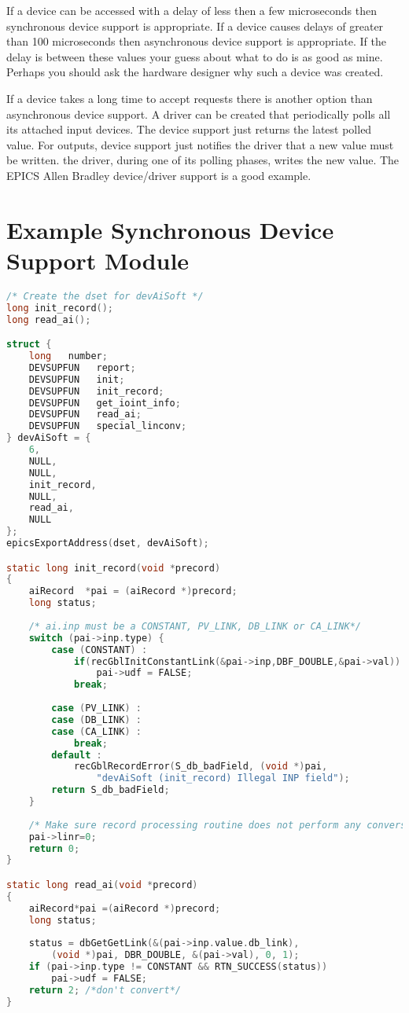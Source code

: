 If a device can be accessed with a delay of less then a few microseconds then synchronous device support is appropriate. 
If a device causes delays of greater than 100 microseconds then asynchronous device support is appropriate. If the delay is 
between these values your guess about what to do is as good as mine. Perhaps you should ask the hardware designer why 
such a device was created.

If a device takes a long time to accept requests there is another option than asynchronous device support. A driver can be 
created that periodically polls all its attached input devices. The device support just returns the latest polled value. For 
outputs, device support just notifies the driver that a new value must be written. the driver, during one of its polling 
phases, writes the new value. The EPICS Allen Bradley device/driver support is a good example.

\section{Example Synchronous Device Support Module}

\begin{lstlisting}[language=C]
/* Create the dset for devAiSoft */
long init_record();
long read_ai();

struct {
    long   number;
    DEVSUPFUN   report;
    DEVSUPFUN   init;
    DEVSUPFUN   init_record;
    DEVSUPFUN   get_ioint_info;
    DEVSUPFUN   read_ai;
    DEVSUPFUN   special_linconv;
} devAiSoft = {
    6,
    NULL,
    NULL,
    init_record,
    NULL,
    read_ai,
    NULL
};
epicsExportAddress(dset, devAiSoft);

static long init_record(void *precord)
{
    aiRecord  *pai = (aiRecord *)precord;
    long status;
    
    /* ai.inp must be a CONSTANT, PV_LINK, DB_LINK or CA_LINK*/
    switch (pai->inp.type) {
        case (CONSTANT) :
            if(recGblInitConstantLink(&pai->inp,DBF_DOUBLE,&pai->val))
                pai->udf = FALSE;
            break;
        
        case (PV_LINK) :
        case (DB_LINK) :
        case (CA_LINK) :
            break;
        default :
            recGblRecordError(S_db_badField, (void *)pai,
                "devAiSoft (init_record) Illegal INP field");
        return S_db_badField;
    }
    
    /* Make sure record processing routine does not perform any conversion*/
    pai->linr=0;
    return 0;
}

static long read_ai(void *precord)
{
    aiRecord*pai =(aiRecord *)precord;
    long status;
    
    status = dbGetGetLink(&(pai->inp.value.db_link),
        (void *)pai, DBR_DOUBLE, &(pai->val), 0, 1);
    if (pai->inp.type != CONSTANT && RTN_SUCCESS(status))
        pai->udf = FALSE;
    return 2; /*don't convert*/
}
\end{lstlisting}

